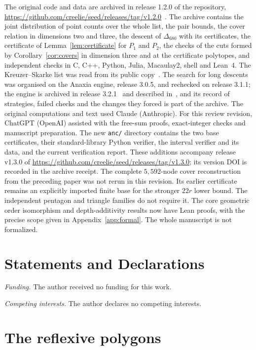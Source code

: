 \documentclass[manuscript]{aomart}
\theoremstyle{definition}
\theoremstyle{remark}
\newcommand{\Dbig}{\Delta_{680}}
\begin{document}
The original code and data are archived in release 1.2.0 of the repository,
\url{https://github.com/creelie/seed/releases/tag/v1.2.0}~\cite{Repo}. The
archive contains the joint distribution of point counts over the whole
list, the pair bounds, the cover relation in dimensions two and three, the
descent of $\Dbig$ with its certificates, the certificate of
Lemma~\ref{lem:certificate} for $P_1$ and $P_2$, the checks of the cuts formed by
Corollary~\ref{cor:covers} in dimension three and at the certificate polytopes, and independent checks in
C, C++, Python, Julia, Macaulay2, shell and Lean~4. The Kreuzer--Skarke
list was read from its public copy~\cite{HF4D}. The search for long
descents was organised on the Anaxia engine, release 3.0.5, and rechecked
on release 3.1.1; the engine is archived in release 3.2.1~\cite{Ana26} and described in~\cite{BB26}, and its record of strategies,
failed checks and the changes they forced is part of the archive. The original computations and text used Claude (Anthropic).
For this review revision, ChatGPT (OpenAI) assisted with the free-sum
proofs, exact-integer checks and manuscript preparation. The new
\texttt{anc/} directory contains the two base certificates, their
standard-library Python verifier, the interval verifier and its data,
and the current verification report. These additions accompany release v1.3.0 of \url{https://github.com/creelie/seed/releases/tag/v1.3.0}; its version DOI is recorded in the archive receipt. The complete $5{,}592$-node cover reconstruction
from the preceding paper was not rerun in this revision. Its earlier
certificate remains an explicitly imported finite base for the
stronger $22r$ lower bound. The independent pentagon and triangle
families do not require it. The core geometric order isomorphism and depth-additivity results now have Lean proofs, with the precise scope given in Appendix~\ref{app:formal}. The whole manuscript is not formalized.

\section*{Statements and Declarations}

\noindent\textit{Funding.} The author received no funding for this work.

\noindent\textit{Competing interests.} The author declares no competing
interests.

\appendix

\section{The reflexive polygons}\label{app:twod}
\end{document}
